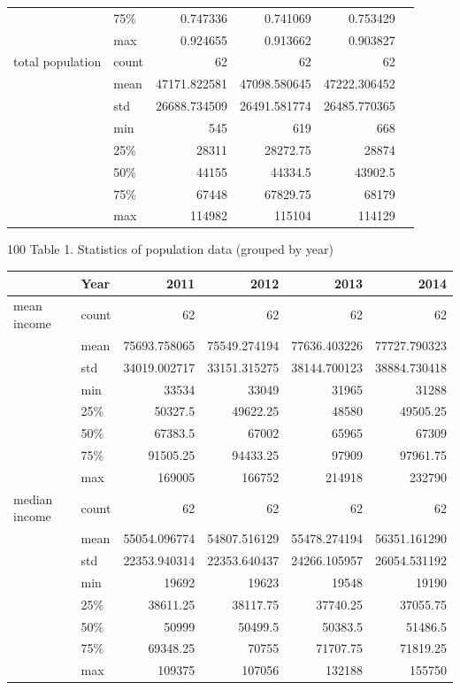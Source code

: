 \documentclass{article}
\begin{document}
\begin{tabular}{llrrrr}
& 75\% &       0.747336 &       0.741069 &       0.753429 \\           & max &       0.924655 &       0.913662 &       0.903827 \\total population & count &      62 &      62 &      62 & \\           & mean &   47171.822581 &   47098.580645 &   47222.306452 & \\           & std &   26688.734509 &   26491.581774 &   26485.770365 & \\           & min &     545 &     619 &     668 & \\           & 25\% &   28311 &   28272.75 &   28874 & \\           & 50\% &   44155 &   44334.5 &   43902.5 & \\           & 75\% &   67448 &   67829.75 &   68179 & \\           & max &  114982 &  115104 &  114129 & \\
\bottomrule
\end{tabular}
\par
\centerline{{\color{white} 100} Table 1. Statistics of population data (grouped by year)}
\par
\begin{tabular}{llrrrr}
\toprule      & Year &         2011 &         2012 &         2013 &         2014 \\
\midrule
mean income & count &      62 &      62 &      62 &      62 \\              & mean &   75693.758065 &   75549.274194 &   77636.403226 &   77727.790323 \\              & std &   34019.002717 &   33151.315275 &   38144.700123 &   38884.730418 \\              & min &   33534 &   33049 &   31965 &   31288 \\              & 25\% &   50327.5 &   49622.25 &   48580 &   49505.25 \\              & 50\% &   67383.5 &   67002 &   65965 &   67309 \\              & 75\% &   91505.25 &   94433.25 &   97909 &   97961.75 \\              & max &  169005 &  166752 &  214918 &  232790 \\median income & count &      62 &      62 &      62 &      62 \\              & mean &   55054.096774 &   54807.516129 &   55478.274194 &   56351.161290 \\              & std &   22353.940314 &   22353.640437 &   24266.105957 &   26054.531192 \\              & min &   19692 &   19623 &   19548 &   19190 \\              & 25\% &   38611.25 &   38117.75 &   37740.25 &   37055.75 \\              & 50\% &   50999 &   50499.5 &   50383.5 &   51486.5 \\              & 75\% &   69348.25 &   70755 &   71707.75 &   71819.25 \\              & max &  109375 &  107056 &  132188 &  155750 \\
\bottomrule
\end{tabular}
\end{document}

